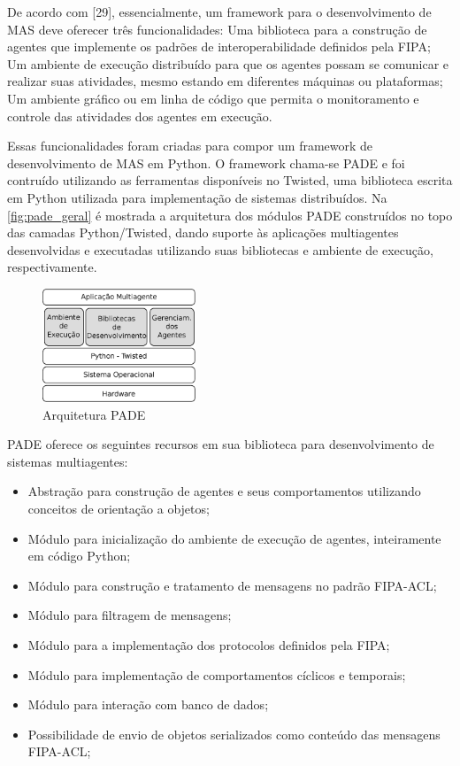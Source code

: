 \documentclass[journal]{IEEEtran}
\begin{document}
De acordo com [29], essencialmente, um framework para o desenvolvimento de MAS deve oferecer três funcionalidades:
Uma biblioteca para a construção de agentes que implemente os padrões de interoperabilidade definidos pela FIPA;
Um ambiente de execução distribuído para que os agentes possam se comunicar e realizar suas atividades, mesmo estando em diferentes máquinas ou plataformas;
Um ambiente gráfico ou em linha de código que permita o monitoramento e controle das atividades dos agentes em execução.

Essas funcionalidades foram criadas para compor um framework de desenvolvimento de MAS em Python. O framework chama-se PADE e foi contruído utilizando as ferramentas disponíveis no Twisted, uma biblioteca escrita em Python utilizada para implementação de sistemas distribuídos. Na \autoref{fig:pade_geral} é mostrada a arquitetura dos módulos PADE construídos no topo das camadas Python/Twisted, dando suporte às aplicações multiagentes desenvolvidas e executadas utilizando suas bibliotecas e ambiente de execução, respectivamente.

\begin{figure}[htb]
    \centering
    \includegraphics[width=1.8in]{Figuras/pade-visao-geral.eps}
    \caption{\label{fig:pade_geral} Arquitetura PADE}
\end{figure}


 PADE oferece os seguintes recursos em sua biblioteca para desenvolvimento de sistemas multiagentes:

 \begin{itemize}
   \item Abstração para construção de agentes e seus comportamentos utilizando conceitos de orientação a objetos;
  \item Módulo para inicialização do ambiente de execução de agentes, inteiramente em código Python;  
  \item Módulo para construção e tratamento de mensagens no padrão FIPA-ACL;
  \item Módulo para filtragem de mensagens;
  \item Módulo para a implementação dos protocolos definidos pela FIPA;
  \item Módulo para implementação de comportamentos cíclicos e temporais;
  \item Módulo para interação com banco de dados;
  \item Possibilidade de envio de objetos serializados como conteúdo das mensagens FIPA-ACL;
 \end{itemize}
\end{document}
